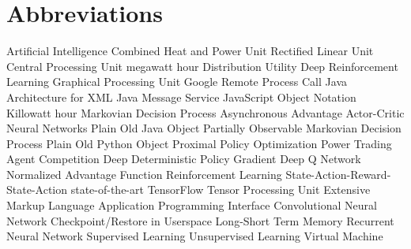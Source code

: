 \newpage
\section*{Abbreviations}
\begin        {acronym}[PowerTAC]
	       {Artificial Intelligence}
	      {Combined Heat and Power Unit}
         {Rectified Linear Unit}
	      {Central Processing Unit}
          {megawatt hour}
	       {Distribution Utility}
	   {Deep Reinforcement Learning}
	      {Graphical Processing Unit}
	     {Google Remote Process Call}
	     {Java Architecture for XML}
	      {Java Message Service}
	     {JavaScript Object Notation}
          {Killowatt hour}
	      {Markovian Decision Process}
          {Asynchronous Advantage Actor-Critic}
	       {Neural Networks}
	     {Plain Old Java Object}
	    {Partially Observable Markovian Decision Process}
	     {Plain Old Python Object}
	      {Proximal Policy Optimization}
	 {Power Trading Agent Competition}
         {Deep Deterministic Policy Gradient}
          {Deep Q Network}
          {Normalized Advantage Function}
	       {Reinforcement Learning}
	    {State-Action-Reward-State-Action}
	     {state-of-the-art}
	       {TensorFlow}
	      {Tensor Processing Unit}
	      {Extensive Markup Language}
          {Application Programming Interface}
          {Convolutional Neural Network}
         {Checkpoint/Restore in Userspace}
         {Long-Short Term Memory}
          {Recurrent Neural Network}
           {Supervised Learning}
           {Unsupervised Learning}
           {Virtual Machine}

\end          {acronym}
